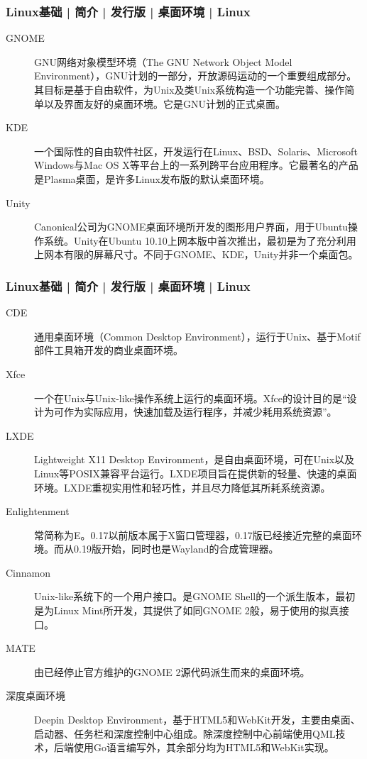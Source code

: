 \begin{frame}
  \frametitle{Linux基础 | 简介 | 发行版 | 桌面环境 | Linux}
  \begin{description}
    \item[GNOME] GNU网络对象模型环境（The GNU Network Object Model Environment），GNU计划的一部分，开放源码运动的一个重要组成部分。其目标是基于自由软件，为Unix及类Unix系统构造一个功能完善、操作简单以及界面友好的桌面环境。它是GNU计划的正式桌面。
    \item[KDE] 一个国际性的自由软件社区，开发运行在Linux、BSD、Solaris、Microsoft Windows与Mac OS X等平台上的一系列跨平台应用程序。它最著名的产品是Plasma桌面，是许多Linux发布版的默认桌面环境。
    \item[Unity] Canonical公司为GNOME桌面环境所开发的图形用户界面，用于Ubuntu操作系统。Unity在Ubuntu 10.10上网本版中首次推出，最初是为了充分利用上网本有限的屏幕尺寸。不同于GNOME、KDE，Unity并非一个桌面包。
  \end{description}
\end{frame}

\begin{frame}
  \frametitle{Linux基础 | 简介 | 发行版 | 桌面环境 | Linux}
  {\footnotesize
  \begin{description}
    \item[CDE] 通用桌面环境（Common Desktop Environment），运行于Unix、基于Motif部件工具箱开发的商业桌面环境。
    \item[Xfce] 一个在Unix与Unix-like操作系统上运行的桌面环境。Xfce的设计目的是“设计为可作为实际应用，快速加载及运行程序，并减少耗用系统资源”。
    \item[LXDE] Lightweight X11 Desktop Environment，是自由桌面环境，可在Unix以及Linux等POSIX兼容平台运行。LXDE项目旨在提供新的轻量、快速的桌面环境。LXDE重视实用性和轻巧性，并且尽力降低其所耗系统资源。
    \item[Enlightenment] 常简称为E。0.17以前版本属于X窗口管理器，0.17版已经接近完整的桌面环境。而从0.19版开始，同时也是Wayland的合成管理器。
    \item[Cinnamon] Unix-like系统下的一个用户接口。是GNOME Shell的一个派生版本，最初是为Linux Mint所开发，其提供了如同GNOME 2般，易于使用的拟真接口。
    \item[MATE] 由已经停止官方维护的GNOME 2源代码派生而来的桌面环境。
    \item[深度桌面环境] Deepin Desktop Environment，基于HTML5和WebKit开发，主要由桌面、启动器、任务栏和深度控制中心组成。除深度控制中心前端使用QML技术，后端使用Go语言编写外，其余部分均为HTML5和WebKit实现。
  \end{description}
  }
\end{frame}

